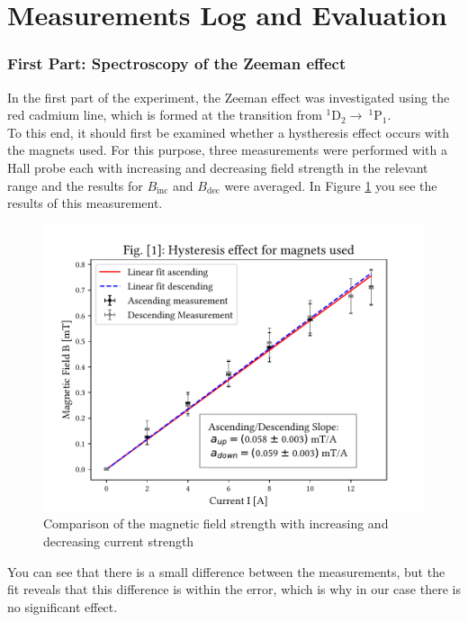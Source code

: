 \section{Measurements Log and Evaluation}
\subsubsection{First Part: Spectroscopy of the Zeeman effect}
In the first part of the experiment, the Zeeman effect was investigated using the red cadmium line, which is formed at the transition from $^1\text{D}_2\rightarrow ~^1\text{P}_1$.\\

To this end, it should first be examined whether a hystheresis effect occurs with the magnets used.
For this purpose, three measurements were performed with a Hall probe each with increasing and decreasing field strength in the relevant range and the results for $B_\text{inc}$ and $B_\text{dec}$ were averaged.
In Figure \ref{fig:hystheresis} you see the results of this measurement.
\begin{figure}[ht]
\centering
\includegraphics[scale=.55]{images//hystheresis.pdf}
\caption{Comparison of the magnetic field strength with increasing and decreasing current strength}
\label{fig:hystheresis}
\end{figure}
You can see that there is a small difference between the measurements, but the fit reveals that this difference is within the error, which is why in our case there is no significant effect.\\

